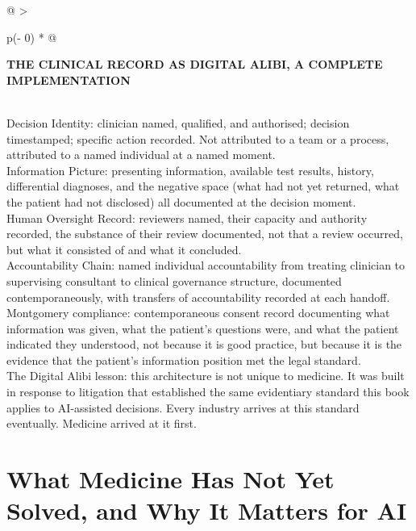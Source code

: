 \begin{longtable}[]{@{}
  >{\raggedright\arraybackslash}p{(\columnwidth - 0\tabcolsep) * }@{}}
\toprule\noalign{}
\begin{minipage}[b]{\linewidth}\raggedright
\textbf{THE CLINICAL RECORD AS DIGITAL ALIBI, A COMPLETE IMPLEMENTATION}
\end{minipage} \\
\midrule\noalign{}
\endhead
\bottomrule\noalign{}
\endlastfoot
Decision Identity: clinician named, qualified, and authorised; decision timestamped; specific action recorded. Not attributed to a team or a process, attributed to a named individual at a named moment. \\
Information Picture: presenting information, available test results, history, differential diagnoses, and the negative space (what had not yet returned, what the patient had not disclosed) all documented at the decision moment. \\
Human Oversight Record: reviewers named, their capacity and authority recorded, the substance of their review documented, not that a review occurred, but what it consisted of and what it concluded. \\
Accountability Chain: named individual accountability from treating clinician to supervising consultant to clinical governance structure, documented contemporaneously, with transfers of accountability recorded at each handoff. \\
Montgomery compliance: contemporaneous consent record documenting what information was given, what the patient's questions were, and what the patient indicated they understood, not because it is good practice, but because it is the evidence that the patient's information position met the legal standard. \\
The Digital Alibi lesson: this architecture is not unique to medicine. It was built in response to litigation that established the same evidentiary standard this book applies to AI-assisted decisions. Every industry arrives at this standard eventually. Medicine arrived at it first. \\
\end{longtable}

\scenebreak

\section{What Medicine Has Not Yet Solved, and Why It Matters for AI}

